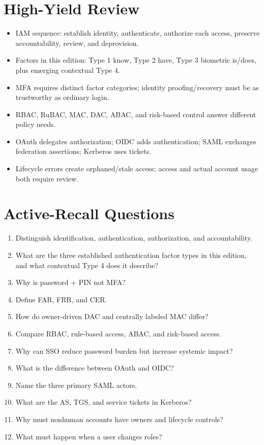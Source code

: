 \documentclass[10pt,letterpaper]{article}
\begin{document}
\section{High-Yield Review}
\begin{itemize}
\item IAM sequence: establish identity, authenticate, authorize each access, preserve accountability, review, and deprovision.
\item Factors in this edition: Type 1 know, Type 2 have, Type 3 biometric is/does, plus emerging contextual Type 4.
\item MFA requires distinct factor categories; identity proofing/recovery must be as trustworthy as ordinary login.
\item RBAC, RuBAC, MAC, DAC, ABAC, and risk-based control answer different policy needs.
\item OAuth delegates authorization; OIDC adds authentication; SAML exchanges federation assertions; Kerberos uses tickets.
\item Lifecycle errors create orphaned/stale access; access and actual account usage both require review.
\end{itemize}

\section{Active-Recall Questions}
\begin{enumerate}
\item Distinguish identification, authentication, authorization, and accountability.
\item What are the three established authentication factor types in this edition, and what contextual Type 4 does it describe?
\item Why is password + PIN not MFA?
\item Define FAR, FRR, and CER.
\item How do owner-driven DAC and centrally labeled MAC differ?
\item Compare RBAC, rule-based access, ABAC, and risk-based access.
\item Why can SSO reduce password burden but increase systemic impact?
\item What is the difference between OAuth and OIDC?
\item Name the three primary SAML actors.
\item What are the AS, TGS, and service tickets in Kerberos?
\item Why must nonhuman accounts have owners and lifecycle controls?
\item What must happen when a user changes roles?
\end{enumerate}
\end{document}
